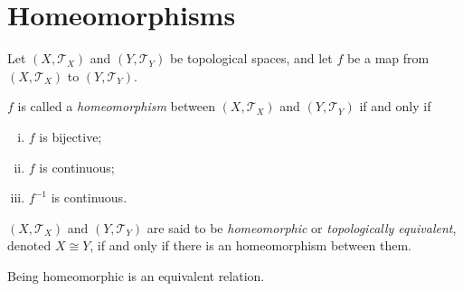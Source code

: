 \section{Homeomorphisms}


Let $(X, \mathcal T_X)$ and $(Y, \mathcal T_Y)$ be topological spaces, and let $f$ be a map from $(X, \mathcal T_X)$ to $(Y, \mathcal T_Y)$.


\begin{definition}
	$f$ is called a \textit{homeomorphism} between $(X, \mathcal T_X)$ and $(Y, \mathcal T_Y)$ if and only if
	\begin{enumerate}[(i)]
		\item $f$ is bijective;
		\item $f$ is continuous;
		\item $f^{-1}$ is continuous.
	\end{enumerate}
\end{definition}


\begin{definition}
	$(X, \mathcal T_X)$ and $(Y, \mathcal T_Y)$ are said to be \textit{homeomorphic} or \textit{topologically equivalent}, denoted $X \cong Y$, if and only if there is an homeomorphism between them.
\end{definition}


\begin{proposition}
	Being homeomorphic is an equivalent relation.
\end{proposition}










































